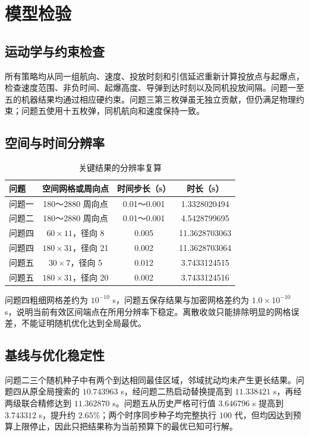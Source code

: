 \documentclass[12pt,a4paper]{article}
\begin{document}
\section{模型检验}

\subsection{运动学与约束检查}

所有策略均从同一组航向、速度、投放时刻和引信延迟重新计算投放点与起爆点，检查速度范围、非负时间、起爆高度、导弹到达时刻以及同机投放间隔。问题一至五的机器结果均通过相应硬约束。问题三第三枚弹虽无独立贡献，但仍满足物理约束；问题五使用十五枚弹，同机航向和速度保持一致。

\subsection{空间与时间分辨率}

\begin{table}[H]
\centering
\caption{关键结果的分辨率复算}
\label{tab:convergence}
\begin{tabular}{lccc}
\toprule
问题 & 空间网格或周向点 & 时间步长（s） & 时长（s） \\
\midrule
问题一 & 180～2880 周向点 & 0.01～0.001 & 1.3328020494 \\
问题二 & 180～2880 周向点 & 0.01～0.001 & 4.5428799695 \\
问题四 & $60\times11$，径向 8 & 0.005 & 11.3628703063 \\
问题四 & $180\times31$，径向 21 & 0.002 & 11.3628703064 \\
问题五 & $30\times7$，径向 5 & 0.012 & 3.7433124515 \\
问题五 & $180\times31$，径向 20 & 0.002 & 3.7433124516 \\
\bottomrule
\end{tabular}
\end{table}

问题四粗细网格差约为 $10^{-10}$ s，问题五保存结果与加密网格差约为 $1.0\times10^{-10}$ s，说明当前有效区间端点在所用分辨率下稳定。离散收敛只能排除明显的网格误差，不能证明随机优化达到全局最优。

\subsection{基线与优化稳定性}

问题二三个随机种子中有两个到达相同最佳区域，邻域扰动均未产生更长结果。问题四从原全局搜索的 $10.743963$ s，经问题二热启动替换提高到 $11.338421$ s，再经两级联合精修达到 $11.362870$ s。问题五从历史严格可行值 $3.646796$ s 提高到 $3.743312$ s，提升约 $2.65\%$；两个时序同步种子均完整执行 $100$ 代，但均因达到预算上限停止，因此只把结果称为当前预算下的最优已知可行解。
\end{document}
